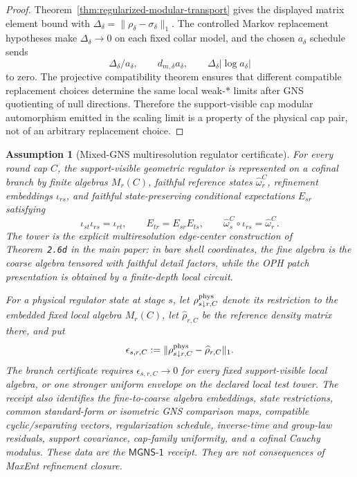 \documentclass[11pt]{article}
\newtheorem{assumption}[theorem]{Assumption}
\begin{document}
\begin{proof}
Theorem~\ref{thm:regularized-modular-transport} gives the displayed matrix
element bound with
\(\Delta_\delta=\|\rho_\delta-\sigma_\delta\|_1\). The controlled Markov
replacement hypotheses make \(\Delta_\delta\to0\) on each fixed collar model,
and the chosen \(a_\delta\) schedule sends
\[
\Delta_\delta/a_\delta,\qquad
d_{m,\delta}a_\delta,\qquad
\Delta_\delta|\log a_\delta|
\]
to zero. The projective compatibility theorem ensures that different
compatible replacement choices determine the same local weak-\(*\) limits after
GNS quotienting of null directions. Therefore the support-visible cap modular
automorphism emitted in the scaling limit is a property of the physical cap
pair, not of an arbitrary replacement choice.
\end{proof}

\begin{assumption}[Mixed-GNS multiresolution regulator certificate]\label{ass:multiresolution-regulator-certificate}
For every round cap \(C\), the support-visible geometric regulator is represented on a cofinal
branch by finite algebras \(M_r(C)\), faithful reference states \(\widehat\omega_r^C\),
refinement embeddings \(\iota_{rs}\), and faithful state-preserving conditional expectations
\(E_{sr}\) satisfying
\[
\iota_{st}\iota_{rs}=\iota_{rt},\qquad
E_{tr}=E_{sr}E_{ts},\qquad
\widehat\omega_s^C\circ\iota_{rs}=\widehat\omega_r^C.
\]
The tower is the explicit multiresolution edge-center construction of
Theorem~\texttt{2.6d} in the main paper: in bare shell coordinates, the fine algebra is the coarse
algebra tensored with faithful detail factors, while the OPH patch presentation is obtained by a
finite-depth local circuit.

For a physical regulator state at stage \(s\), let
\(\rho^{\rm phys}_{s\downarrow r,C}\) denote its restriction to the embedded fixed local algebra
\(M_r(C)\), let \(\widehat\rho_{r,C}\) be the reference density matrix there, and put
\[
\epsilon_{s,r,C}:=
\|\rho^{\rm phys}_{s\downarrow r,C}-\widehat\rho_{r,C}\|_1.
\]
The branch certificate requires \(\epsilon_{s,r,C}\to0\) for every fixed support-visible local
algebra, or one stronger uniform envelope on the declared local test tower.  The receipt also
identifies the fine-to-coarse algebra embeddings, state restrictions, common standard-form or
isometric GNS comparison maps, compatible cyclic/separating vectors, regularization schedule,
inverse-time and group-law residuals, support covariance, cap-family uniformity, and a cofinal
Cauchy modulus.  These data are the \(\mathsf{MGNS\text{-}1}\) receipt.  They are not consequences
of MaxEnt refinement closure.
\end{assumption}
\end{document}
